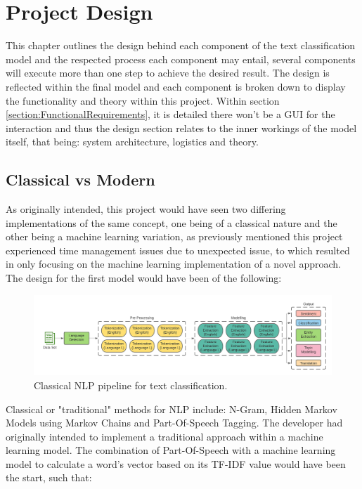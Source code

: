 \chapter{Project Design}

This chapter outlines the design behind each component of the text classification model and the respected process each component may entail, several components will execute more than one step to achieve the desired result. The design is reflected within the final model and each component is broken down to display the functionality and theory within this project. Within section \ref{section:FunctionalRequirements}, it is detailed there won’t be a GUI for the interaction and thus the design section relates to the inner workings of the model itself, that being: system architecture, logistics and theory.

\section{Classical vs Modern}

As originally intended, this project would have seen two differing implementations of the same concept, one being of a classical nature and the other being a machine learning variation, as previously mentioned this project experienced time management issues due to unexpected issue, to which resulted in only focusing on the machine learning implementation of a novel approach. The design for the first model would have been of the following:

\begin{figure}[H]
    \centering
    \includegraphics[width=\textwidth]{figures/chapter-5/ClassicalNLP.pdf}
    \caption[ClassicalNLP]{Classical NLP pipeline for text classification.
    \label{fig:ClassicalNLP}}
\end{figure}

Classical or "traditional" methods for NLP include: N-Gram, Hidden Markov Models using Markov Chains and Part-Of-Speech Tagging. The developer had originally intended to implement a traditional approach within a machine learning model. The combination of Part-Of-Speech with a machine learning model to calculate a word’s vector based on its TF-IDF value would have been the start, such that:

